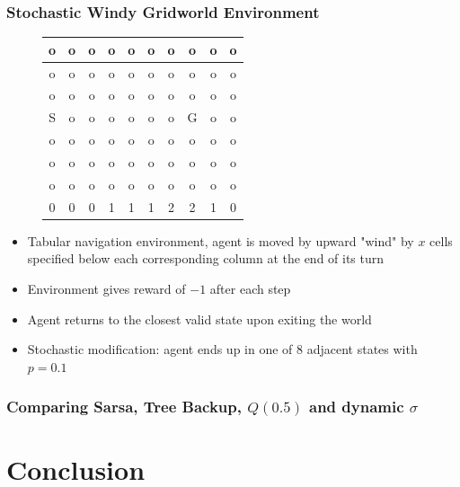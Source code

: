 \documentclass{beamer}
\begin{document}
\begin{frame}
  \frametitle{Stochastic Windy Gridworld Environment}
  \begin{figure}
    \centering
    \begin{tabular}{ | c | c | c | c | c | c | c | c | c | c | }
      \hline
      o & o & o & o & o & o & o & o & o & o\\ \hline
      o & o & o & o & o & o & o & o & o & o\\ \hline
      o & o & o & o & o & o & o & o & o & o\\ \hline
      S & o & o & o & o & o & o & G & o & o\\ \hline
      o & o & o & o & o & o & o & o & o & o\\ \hline
      o & o & o & o & o & o & o & o & o & o\\ \hline
      o & o & o & o & o & o & o & o & o & o\\ \hline
      0 & 0 & 0 & 1 & 1 & 1 & 2 & 2 & 1 & 0\\ \hline
    \end{tabular}
  \end{figure}
  \begin{itemize}
    \item Tabular navigation environment, agent is moved by upward "wind" by $x$
      cells specified below each corresponding column at the end of its turn
    \item Environment gives reward of $-1$ after each step
    \item Agent returns to the closest valid state upon exiting the world
    \item Stochastic modification: agent ends up in one of 8 adjacent states
      with $p = 0.1$
  \end{itemize}
\end{frame}

\begin{frame}
  \frametitle{Comparing Sarsa, Tree Backup, $Q(0.5)$ and dynamic $\sigma$}
\end{frame}

\section{Conclusion}
\end{document}
